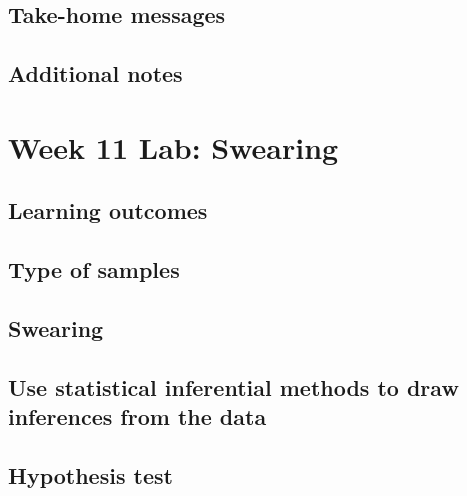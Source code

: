\documentclass[
]{report}
\begin{document}
\hypertarget{take-home-messages-18}{%
\subsection{Take-home messages}\label{take-home-messages-18}}

\hypertarget{additional-notes-17}{%
\subsection{Additional notes}\label{additional-notes-17}}

\hypertarget{week-11-lab-swearing}{%
\section{Week 11 Lab: Swearing}\label{week-11-lab-swearing}}

\hypertarget{learning-outcomes-22}{%
\subsection{Learning outcomes}\label{learning-outcomes-22}}

\hypertarget{type-of-samples}{%
\subsection{Type of samples}\label{type-of-samples}}

\hypertarget{swearing}{%
\subsection{Swearing}\label{swearing}}

\hypertarget{use-statistical-inferential-methods-to-draw-inferences-from-the-data-2}{%
\subsection*{Use statistical inferential methods to draw inferences from the data}\label{use-statistical-inferential-methods-to-draw-inferences-from-the-data-2}}

\hypertarget{hypothesis-test-1}{%
\subsection*{Hypothesis test}\label{hypothesis-test-1}}
\end{document}
